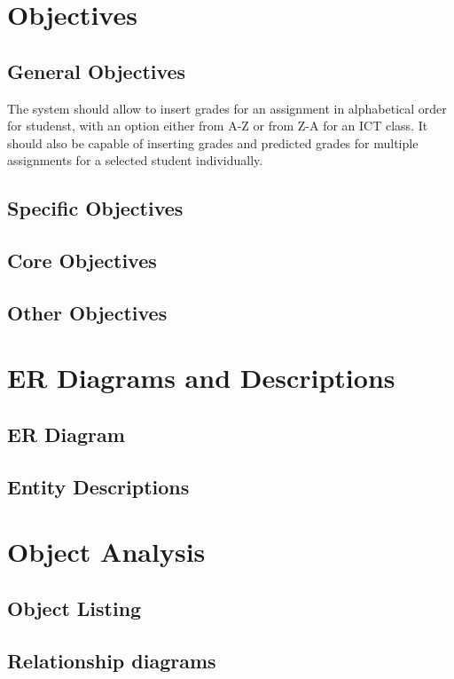 \begin{algorithm}[H]
\section{Objectives}
\subsection{General Objectives}

The system should allow to insert grades for an assignment in alphabetical order for studenst, with an option either from A-Z or from Z-A for an ICT class. It should also be capable of inserting grades and predicted grades for multiple assignments for a selected student individually.

\subsection{Specific Objectives}

\subsection{Core Objectives}

\subsection{Other Objectives}

\section{ER Diagrams and Descriptions}

\subsection{ER Diagram}

\subsection{Entity Descriptions}

\section{Object Analysis}

\subsection{Object Listing}

\subsection{Relationship diagrams}


\end{algorithm}
